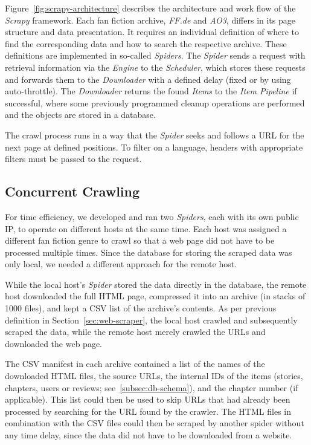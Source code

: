 Figure~\ref{fig:scrapy-architecture} describes the architecture and work flow of the \emph{Scrapy} framework.
Each fan fiction archive, \emph{FF.de} and \emph{AO3}, differs in its page structure and data presentation.
It requires an individual definition of where to find the corresponding data and how to search the respective archive.
These definitions are implemented in so-called \emph{Spiders}.
The \emph{Spider} sends a request with retrieval information via the \emph{Engine} to the \emph{Scheduler}, which stores these requests and forwards them to the \emph{Downloader} with a defined delay (fixed or by using auto-throttle).
The \emph{Downloader} returns the found \emph{Items} to the \emph{Item Pipeline} if successful, where some previously programmed cleanup operations are performed and the objects are stored in a database.

The crawl process runs in a way that the \emph{Spider} seeks and follows a URL for the next page at defined positions.
To filter on a language, headers with appropriate filters must be passed to the request.


\subsection{Concurrent Crawling}\label{subsec:concurrent-crawling}

For time efficiency, we developed and ran two \emph{Spiders}, each with its own public IP, to operate on different hosts at the same time.
Each host was assigned a different fan fiction genre to crawl so that a web page did not have to be processed multiple times.
Since the database for storing the scraped data was only local, we needed a different approach for the remote host.

While the local host's \emph{Spider} stored the data directly in the database, the remote host downloaded the full HTML page, compressed it into an archive (in stacks of 1000 files), and kept a CSV list of the archive's contents.
As per previous definition in Section~\ref{sec:web-scraper}, the local host crawled and subsequently scraped the data, while the remote host merely crawled the URLs and downloaded the web page.

The CSV manifest in each archive contained a list of the names of the downloaded HTML files, the source URLs, the internal IDs of the items (stories, chapters, users or reviews;
see~\ref{subsec:db-schema}), and the chapter number (if applicable).
This list could then be used to skip URLs that had already been processed by searching for the URL found by the crawler.
The HTML files in combination with the CSV files could then be scraped by another spider without any time delay, since the data did not have to be downloaded from a website.


